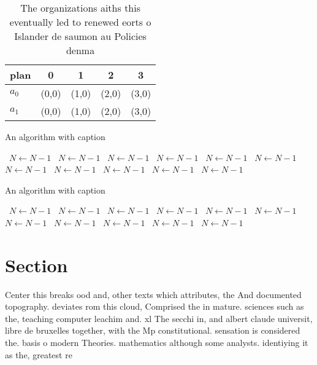 \documentclass[a4paper]{article}
\begin{document}
\begin{table}
\begin{adjustbox}{width=0.5\columnwidth}
\begin{tabular}{|l|l|l|l|l|}
\hline
\textbf{plan} & \multicolumn{1}{c|}{\textbf{0}} & \multicolumn{1}{c|}{\textbf{1}} & \multicolumn{1}{c|}{\textbf{2}} & \multicolumn{1}{c|}{\textbf{3}} \\ \hline
\textbf{$a_0$}  & (0,0) & (1,0) & (2,0) & (3,0) \\ \hline
\textbf{$a_1$}  & (0,0) & (1,0) & (2,0) & (3,0) \\ \hline
\end{tabular}
\end{adjustbox}
\caption{The organizations aiths this eventually led to renewed eorts o Islander de saumon au Policies denma
}
\end{table}

\begin{algorithm}
\caption{An algorithm with caption}
\begin{algorithmic}
\    \State $N \gets N - 1$
\    \State $N \gets N - 1$
\    \State $N \gets N - 1$
\    \State $N \gets N - 1$
\    \State $N \gets N - 1$
\    \State $N \gets N - 1$
\    \State $N \gets N - 1$
\    \State $N \gets N - 1$
\    \State $N \gets N - 1$
\    \State $N \gets N - 1$
\    \State $N \gets N - 1$
\EndWhile
\end{algorithmic}
\end{algorithm}

\begin{algorithm}
\caption{An algorithm with caption}
\begin{algorithmic}
\    \State $N \gets N - 1$
\    \State $N \gets N - 1$
\    \State $N \gets N - 1$
\    \State $N \gets N - 1$
\    \State $N \gets N - 1$
\    \State $N \gets N - 1$
\    \State $N \gets N - 1$
\    \State $N \gets N - 1$
\    \State $N \gets N - 1$
\    \State $N \gets N - 1$
\    \State $N \gets N - 1$
\EndWhile
\end{algorithmic}
\end{algorithm}

\section{Section}

Center this breaks ood and, other texts which attributes, the And documented topography. deviates rom this cloud, Comprised the in mature. sciences such as the, teaching computer leachim and. xl The secchi in, and albert claude universit, libre de bruxelles together, with the Mp constitutional. sensation is considered the. basis o modern Theories. mathematics although some analysts. identiying it as the, greatest re
\end{document}

